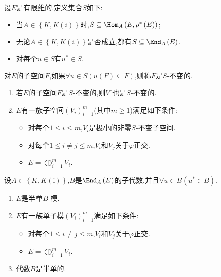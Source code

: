 \begin{theorem}{}{}
	设$E$是有限维的.定义集合$S$如下:
	\begin{itemize}
		\item 当$A\in\left\{K,K(i)\right\}$时,$S\subseteq\Hom_{A}\left(E,\rho^{\ast}\left(E\right)\right)$;
		\item 无论$A\in\left\{K,K(i)\right\}$是否成立,都有$S\subseteq\End_{A}\left(E\right)$.
		\item 对每个$u\in S$有$u^{\ast}\in S$.
	\end{itemize}
	对$E$的子空间$F$,如果$\forall u\in S\left(u\left(F\right)\subseteq F\right)$,则称$F$是$S$-不变的.
	\begin{enumerate}
		\item 若$E$的子空间$F$是$S$-不变的,则$V^{\circ}$也是$S$-不变的.
		\item $E$有一族子空间$\left(V_{i}\right)_{i=1}^{m}$(其中$m\geq 1$)满足如下条件:
		\begin{itemize}
			\item 对每个$1\leq i\leq m$,$V_{i}$是极小的非零$S$-不变子空间.
			\item 对每个$1\leq i\neq j\leq m$,$V_{i}$和$V_{j}$关于$\varphi$正交.
			\item $E=\bigoplus\limits_{i=1}^{m}V_{i}$.
		\end{itemize}
	\end{enumerate}
\end{theorem}

\begin{corollary}{}{}
	设$A\in\left\{K,K(\mathrm{i})\right\}$,$B$是$\End_{A}\left(E\right)$的子代数,并且$\forall u\in B\left(u^{\ast}\in B\right)$.
	\begin{enumerate}
		\item $E$是半单$B$-模.
		\item $E$有一族单子模$\left(V_{i}\right)_{i=1}^{m}$满足如下条件:
		\begin{itemize}
			\item 对每个$1\leq i\neq j\leq m$,$V_{i}$和$V_{j}$关于$\varphi$正交.
			\item $E=\bigoplus\limits_{i=1}^{m}V_{i}$.
		\end{itemize}
		\item 代数$B$是半单的.
	\end{enumerate}
\end{corollary}


